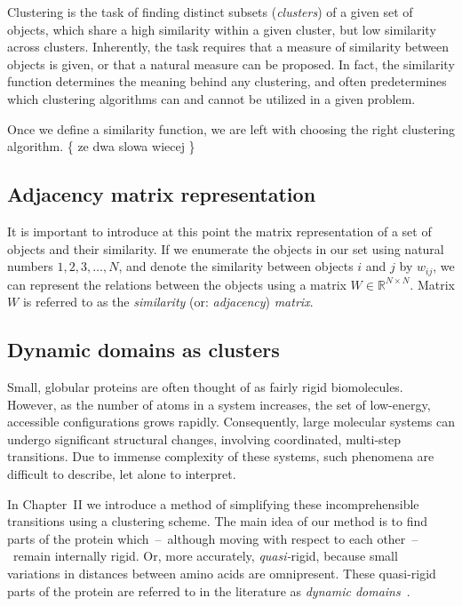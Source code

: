 Clustering is the task of finding distinct subsets (\emph{clusters}) of a given set of objects, which share a high similarity within a given cluster, but low similarity across clusters.
Inherently, the task requires that a measure of similarity between objects is given, or that a natural measure can be proposed.
In fact, the similarity function determines the meaning behind any clustering, and often predetermines which clustering algorithms can and cannot be utilized in a given problem.

Once we define a similarity function, we are left with choosing the right clustering algorithm.
\{ ze dwa slowa wiecej \}


\subsection{Adjacency matrix representation}\label{sec:matrixRepresentation}

It is important to introduce at this point the matrix representation of a set of objects and their similarity.
If we enumerate the objects in our set using natural numbers $1,2,3,\ldots,N$, and denote the similarity between objects $i$ and $j$ by $w_{ij}$, we can represent the relations between the objects using a matrix $W\in\mathbb{R}^{N\times N}$.
Matrix $W$ is referred to as the \emph{similarity} (or: \emph{adjacency}) \emph{matrix}.

\subsection{Dynamic domains as clusters}

Small, globular proteins are often thought of as fairly rigid biomolecules.
However, as the number of atoms in a system increases, the set of low-energy, accessible configurations grows rapidly.
Consequently, large molecular systems can undergo significant structural changes, involving coordinated, multi-step transitions.
Due to immense complexity of these systems, such phenomena are difficult to describe, let alone to interpret.

In Chapter~II we introduce a method of simplifying these incomprehensible transitions using a clustering scheme.
The main idea of our method is to find parts of the protein which~--~although moving with respect to each other~--~remain internally rigid.
Or, more accurately, \emph{quasi-}rigid, because small variations in distances between amino acids are omnipresent.
These quasi-rigid parts of the protein are referred to in the literature as \emph{dynamic domains}~\cite{bahar1997direct,hayward1998systematic,hinsen1998analysis}.

